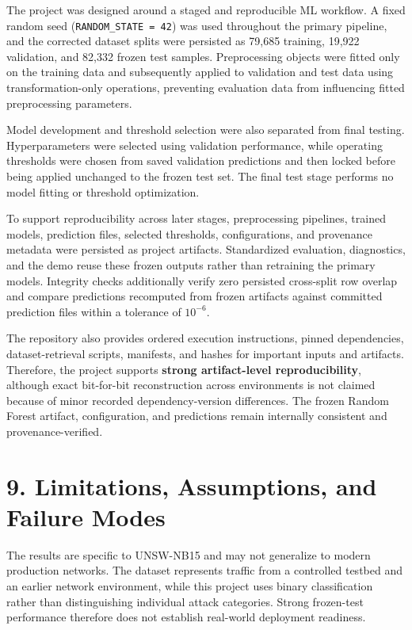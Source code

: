 \documentclass[
  canadian,
  12pt,
]{article}
\let\reportOrigSection\section
\renewcommand{\section}{\par\Needspace*{10\baselineskip}\reportOrigSection}%
\begin{document}
The project was designed around a staged and reproducible ML workflow. A
fixed random seed (\texttt{RANDOM\_STATE\ =\ 42}) was used throughout
the primary pipeline, and the corrected dataset splits were persisted as
79,685 training, 19,922 validation, and 82,332 frozen test samples.
Preprocessing objects were fitted only on the training data and
subsequently applied to validation and test data using
transformation-only operations, preventing evaluation data from
influencing fitted preprocessing parameters.

Model development and threshold selection were also separated from final
testing. Hyperparameters were selected using validation performance,
while operating thresholds were chosen from saved validation predictions
and then locked before being applied unchanged to the frozen test set.
The final test stage performs no model fitting or threshold
optimization.

To support reproducibility across later stages, preprocessing pipelines,
trained models, prediction files, selected thresholds, configurations,
and provenance metadata were persisted as project artifacts.
Standardized evaluation, diagnostics, and the demo reuse these frozen
outputs rather than retraining the primary models. Integrity checks
additionally verify zero persisted cross-split row overlap and compare
predictions recomputed from frozen artifacts against committed
prediction files within a tolerance of \(10^{-6}\).

The repository also provides ordered execution instructions, pinned
dependencies, dataset-retrieval scripts, manifests, and hashes for
important inputs and artifacts. Therefore, the project supports
\textbf{strong artifact-level reproducibility}, although exact
bit-for-bit reconstruction across environments is not claimed because of
minor recorded dependency-version differences. The frozen Random Forest
artifact, configuration, and predictions remain internally consistent
and provenance-verified.

\section[\texorpdfstring{\numberline{9.}Limitations, Assumptions, and Failure Modes}{9. Limitations, Assumptions, and Failure Modes}]{9. Limitations, Assumptions, and Failure Modes}\label{sec-9}

The results are specific to UNSW-NB15 and may not generalize to modern
production networks. The dataset represents traffic from a controlled
testbed and an earlier network environment, while this project uses
binary classification rather than distinguishing individual attack
categories. Strong frozen-test performance therefore does not establish
real-world deployment readiness.
\end{document}
